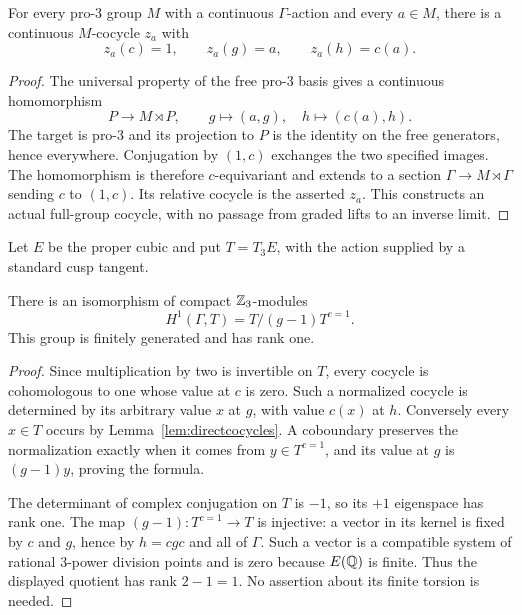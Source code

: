\begin{lemma}\label{lem:directcocycles}
For every pro-$3$ group $M$ with a continuous $\Gamma$-action and
every $a\in M$, there is a continuous $M$-cocycle $z_a$ with
\[
z_a(c)=1,\qquad z_a(g)=a,\qquad z_a(h)=c(a).
\]
\end{lemma}
\begin{proof}
The universal property of the free pro-$3$ basis gives a continuous
homomorphism
\[
P\longrightarrow M\rtimes P,\qquad
g\longmapsto(a,g),\quad h\longmapsto(c(a),h).
\]
The target is pro-$3$ and its projection to $P$ is the identity
on the free generators, hence everywhere. Conjugation by $(1,c)$
exchanges the two specified images. The homomorphism is therefore
$c$-equivariant and extends to a section
$\Gamma\to M\rtimes\Gamma$ sending $c$ to $(1,c)$. Its relative
cocycle is the asserted $z_a$. This constructs an actual full-group
cocycle, with no passage from graded lifts to an inverse limit.
\end{proof}

Let $E$ be the proper cubic and put $T=T_3E$, with the action supplied
by a standard cusp tangent.
\begin{lemma}\label{lem:compactrank}
There is an isomorphism of compact $\mathbb Z_3$-modules
\[
H^1(\Gamma,T)=T/(g-1)T^{c=1}.
\]
This group is finitely generated and has rank one.
\end{lemma}
\begin{proof}
Since multiplication by two is invertible on $T$, every cocycle is
cohomologous to one whose value at $c$ is zero. Such a normalized
cocycle is determined by its arbitrary value $x$ at $g$, with value
$c(x)$ at $h$. Conversely every $x\in T$ occurs by
Lemma~\ref{lem:directcocycles}. A coboundary preserves the
normalization exactly when it comes from $y\in T^{c=1}$, and its
value at $g$ is $(g-1)y$, proving the formula.

The determinant of complex conjugation on $T$ is $-1$, so its
$+1$ eigenspace has rank one. The map
$(g-1):T^{c=1}\to T$ is injective: a vector in its kernel is fixed
by $c$ and $g$, hence by $h=cgc$ and all of $\Gamma$. Such a vector
is a compatible system of rational $3$-power division points and
is zero because $E(\mathbb Q)$ is finite. Thus the displayed quotient
has rank $2-1=1$. No assertion about its finite torsion is needed.
\end{proof}

